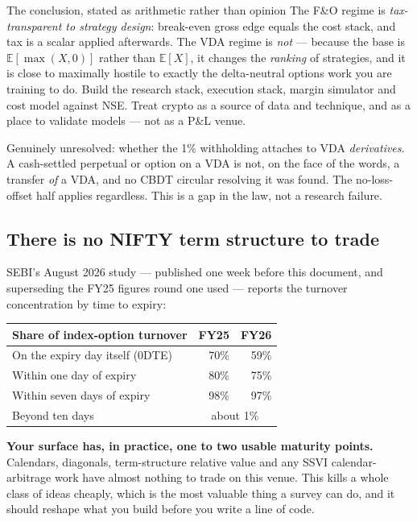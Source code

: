 \documentclass[11pt,a4paper]{article}
\newcommand{\srcnote}[1]{{\footnotesize\color{soft}#1\par}}
\begin{document}
\begin{keyfact}{The conclusion, stated as arithmetic rather than opinion}
The F\&O regime is \emph{tax-transparent to strategy design}: break-even gross
edge equals the cost stack, and tax is a scalar applied afterwards. The VDA
regime is \emph{not} --- because the base is $\mathbb{E}[\max(X,0)]$ rather than
$\mathbb{E}[X]$, it changes the \emph{ranking} of strategies, and it is close to
maximally hostile to exactly the delta-neutral options work you are training to
do. Build the research stack, execution stack, margin simulator and cost model
against NSE. Treat crypto as a source of data and technique, and as a place to
validate models --- not as a P\&L venue.
\end{keyfact}

\srcnote{Genuinely unresolved: whether the 1\% withholding attaches to VDA
\emph{derivatives}. A cash-settled perpetual or option on a VDA is not, on the
face of the words, a transfer \emph{of} a VDA, and no CBDT circular resolving it
was found. The no-loss-offset half applies regardless. This is a gap in the law,
not a research failure.}

\subsection{There is no NIFTY term structure to trade}
\label{sec:noterm}

SEBI's August 2026 study --- published one week before this document, and
superseding the FY25 figures round one used --- reports the turnover
concentration by time to expiry:

\begin{center}
\begin{tabular}{@{}lrr@{}}
\toprule
Share of index-option turnover & FY25 & FY26 \\
\midrule
On the expiry day itself (0DTE) & 70\% & 59\% \\
Within one day of expiry        & 80\% & 75\% \\
Within seven days of expiry     & 98\% & 97\% \\
Beyond ten days                 & \multicolumn{2}{c}{about 1\%} \\
\bottomrule
\end{tabular}
\end{center}

\textbf{Your surface has, in practice, one to two usable maturity points.}
Calendars, diagonals, term-structure relative value and any SSVI calendar-arbitrage
work have almost nothing to trade on this venue. This kills a whole class of ideas
cheaply, which is the most valuable thing a survey can do, and it should reshape
what you build before you write a line of code.
\end{document}
